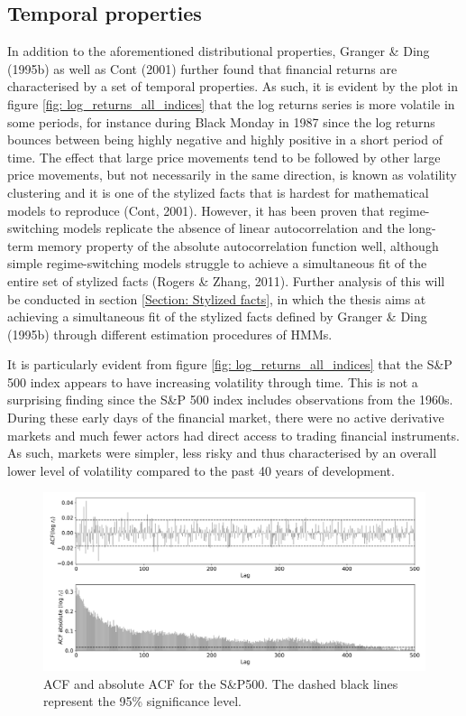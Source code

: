 \subsection{Temporal properties}
\label{subsection: temporal properties}
In addition to the aforementioned distributional properties, Granger \& Ding (1995b) as well as Cont (2001) further found that financial returns are characterised by a set of temporal properties. As such, it is evident by the plot in figure \ref{fig: log_returns_all_indices} that the log returns series is more volatile in some periods, for instance during Black Monday in 1987 since the log returns bounces between being highly negative and highly positive in a short period of time. The effect that large price movements tend to be followed by other large price movements, but not necessarily in the same direction, is known as volatility clustering and it is one of the stylized facts that is hardest for mathematical models to reproduce (Cont, 2001). However, it has been proven that regime-switching models replicate the absence of linear autocorrelation and the long-term memory property of the absolute autocorrelation function well, although simple regime-switching models struggle to achieve a simultaneous fit of the entire set of stylized facts (Rogers \& Zhang, 2011). Further analysis of this will be conducted in section \ref{Section: Stylized facts}, in which the thesis aims at achieving a simultaneous fit of the stylized facts defined by Granger \& Ding (1995b) through different estimation procedures of HMMs.

It is particularly evident from figure \ref{fig: log_returns_all_indices} that the S\&P 500 index appears to have increasing volatility through time. This is not a surprising finding since the S\&P 500 index includes observations from the 1960s. During these early days of the financial market, there were no active derivative markets and much fewer actors had direct access to trading financial instruments. As such, markets were simpler, less risky and thus characterised by an overall lower level of volatility compared to the past 40 years of development.

\begin{figure}[H] 
    \centering
    \includegraphics[width=1\textwidth]{analysis/data_description/images/SP500_ACF.png}
    \caption[ACF and absolute ACF for the S\&P500]{ACF and absolute ACF for the S\&P500. The dashed black lines represent the 95\% significance level.}
    \label{fig: ACF_all_log_returns}
\end{figure}

